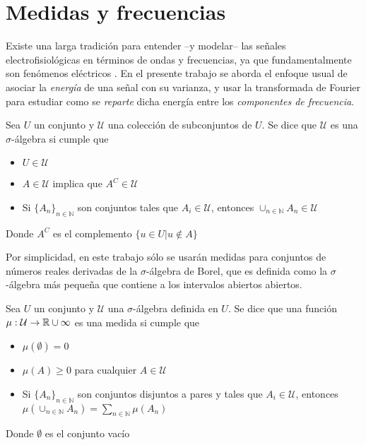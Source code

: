 
\chapter{Medidas y frecuencias}

Existe una larga tradición para entender --y modelar-- las señales electrofisiológicas en términos 
de ondas y frecuencias, ya que fundamentalmente son fenómenos eléctricos \cite{Kaiser00}.
En el presente trabajo se aborda el enfoque usual de asociar la \textit{energía} de una señal con 
su varianza, y usar la transformada de Fourier para estudiar como se \textit{reparte} dicha energía
entre los \textit{componentes de frecuencia}. 

\begin{definicion}
Sea $U$ un conjunto y $\mathcal{U}$ una colección de subconjuntos de $U$. Se dice que $\mathcal{U}$
es una $\sigma$-álgebra si cumple que
\begin{itemize}
\item $U \in \mathcal{U}$
\item $A \in \mathcal{U}$ implica que $A^{C} \in \mathcal{U}$
\item Si $\{ A_n \}_{n\in \mathbb{N}}$ son conjuntos tales que $A_i \in \mathcal{U}$, entonces
$\displaystyle \cup_{n\in \mathbb{N}} A_n \in \mathcal{U}$
\end{itemize}
Donde $A^{C}$ es el complemento $\{ u \in U | u \notin A \} $
\end{definicion}

Por simplicidad, en este trabajo sólo se usarán medidas para conjuntos de números reales derivadas 
de la $\sigma$-álgebra de Borel, que es definida como la $\sigma$-álgebra más pequeña que contiene a 
los intervalos abiertos abiertos.

\begin{definicion}[Medida]
Sea $U$ un conjunto y $\mathcal{U}$ una $\sigma$-álgebra definida en $U$. Se dice que una función
$\mu : \mathcal{U} \rightarrow \mathbb{R} \cup {\infty}$ es una medida si cumple que
\begin{itemize}
\item $\mu(\emptyset) = 0$
\item $\mu(A) \geq 0$ para cualquier $A \in \mathcal{U}$
\item Si $\{ A_n \}_{n\in \mathbb{N}}$ son conjuntos disjuntos a pares y tales que 
$A_i \in \mathcal{U}$, entonces 
$\displaystyle \mu\left( \cup_{n\in \mathbb{N}} A_n \right) = \sum_{n\in \mathbb{N}} \mu(A_n)$
\end{itemize}
Donde $\emptyset$ es el conjunto vacío %
\end{definicion}


